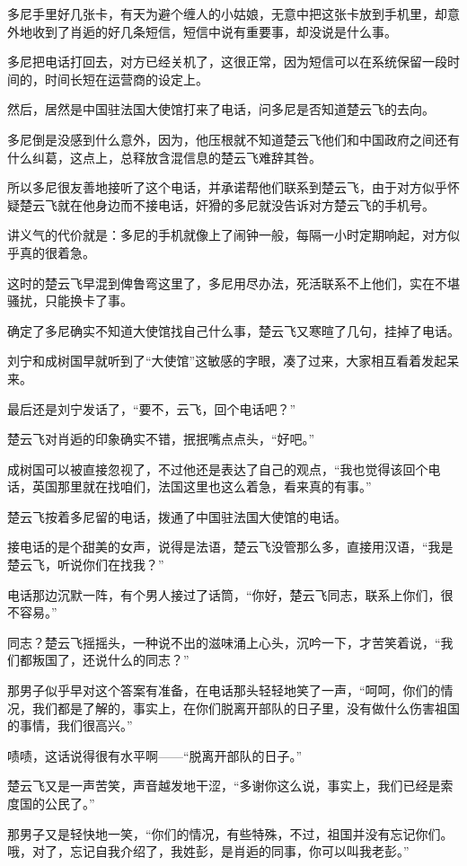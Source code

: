 多尼手里好几张卡，有天为避个缠人的小姑娘，无意中把这张卡放到手机里，却意外地收到了肖逅的好几条短信，短信中说有重要事，却没说是什么事。

多尼把电话打回去，对方已经关机了，这很正常，因为短信可以在系统保留一段时间的，时间长短在运营商的设定上。

然后，居然是中国驻法国大使馆打来了电话，问多尼是否知道楚云飞的去向。

多尼倒是没感到什么意外，因为，他压根就不知道楚云飞他们和中国政府之间还有什么纠葛，这点上，总释放含混信息的楚云飞难辞其咎。

所以多尼很友善地接听了这个电话，并承诺帮他们联系到楚云飞，由于对方似乎怀疑楚云飞就在他身边而不接电话，奸猾的多尼就没告诉对方楚云飞的手机号。

讲义气的代价就是：多尼的手机就像上了闹钟一般，每隔一小时定期响起，对方似乎真的很着急。

这时的楚云飞早混到俾鲁弯这里了，多尼用尽办法，死活联系不上他们，实在不堪骚扰，只能换卡了事。

确定了多尼确实不知道大使馆找自己什么事，楚云飞又寒暄了几句，挂掉了电话。

刘宁和成树国早就听到了“大使馆”这敏感的字眼，凑了过来，大家相互看着发起呆来。

最后还是刘宁发话了，“要不，云飞，回个电话吧？”

楚云飞对肖逅的印象确实不错，抿抿嘴点点头，“好吧。”

成树国可以被直接忽视了，不过他还是表达了自己的观点，“我也觉得该回个电话，英国那里就在找咱们，法国这里也这么着急，看来真的有事。”

楚云飞按着多尼留的电话，拨通了中国驻法国大使馆的电话。

接电话的是个甜美的女声，说得是法语，楚云飞没管那么多，直接用汉语，“我是楚云飞，听说你们在找我？”

电话那边沉默一阵，有个男人接过了话筒，“你好，楚云飞同志，联系上你们，很不容易。”

同志？楚云飞摇摇头，一种说不出的滋味涌上心头，沉吟一下，才苦笑着说，“我们都叛国了，还说什么的同志？”

那男子似乎早对这个答案有准备，在电话那头轻轻地笑了一声，“呵呵，你们的情况，我们都是了解的，事实上，在你们脱离开部队的日子里，没有做什么伤害祖国的事情，我们很高兴。”

啧啧，这话说得很有水平啊——“脱离开部队的日子。”

楚云飞又是一声苦笑，声音越发地干涩，“多谢你这么说，事实上，我们已经是索度国的公民了。”

那男子又是轻快地一笑，“你们的情况，有些特殊，不过，祖国并没有忘记你们。哦，对了，忘记自我介绍了，我姓彭，是肖逅的同事，你可以叫我老彭。”

